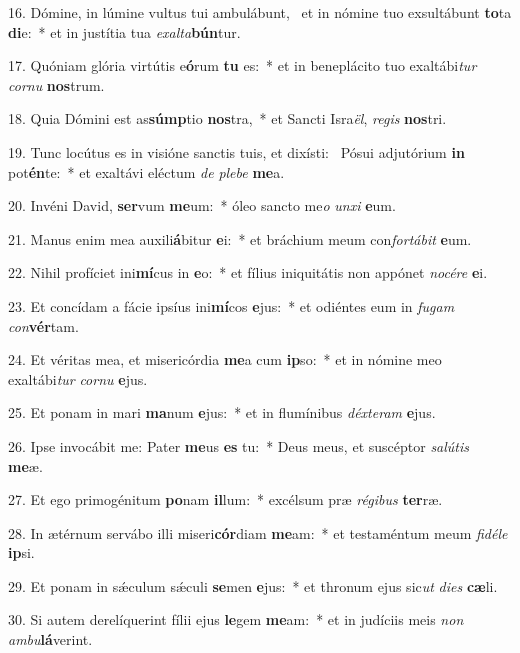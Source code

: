 16. Dómine, in lúmine vultus tui ambulábunt, \dag\  et in nómine tuo exsultábunt \textbf{to}ta \textbf{di}e:~*  et in justítia tua \textit{ex}\textit{al}\textit{ta}\textbf{bún}tur.\

17. Quóniam glória virtútis e\textbf{ó}rum \textbf{tu} es:~*  et in beneplácito tuo exaltábi\textit{tur} \textit{cor}\textit{nu} \textbf{nos}trum.\

18. Quia Dómini est as\textbf{súmp}tio \textbf{nos}tra,~*  et Sancti Isra\textit{ël}, \textit{re}\textit{gis} \textbf{nos}tri.\

19. Tunc locútus es in visióne sanctis tuis, et dixísti: \dag\  Pósui adjutórium \textbf{in} pot\textbf{én}te:~*  et exaltávi eléctum \textit{de} \textit{ple}\textit{be} \textbf{me}a.\

20. Invéni David, \textbf{ser}vum \textbf{me}um:~*  óleo sancto me\textit{o} \textit{un}\textit{xi} \textbf{e}um.\

21. Manus enim mea auxili\textbf{á}bitur \textbf{e}i:~*  et bráchium meum con\textit{for}\textit{tá}\textit{bit} \textbf{e}um.\

22. Nihil profíciet ini\textbf{mí}cus in \textbf{e}o:~*  et fílius iniquitátis non appónet \textit{no}\textit{cé}\textit{re} \textbf{e}i.\

23. Et concídam a fácie ipsíus ini\textbf{mí}cos \textbf{e}jus:~*  et odiéntes eum in \textit{fu}\textit{gam} \textit{con}\textbf{vér}tam.\

24. Et véritas mea, et misericórdia \textbf{me}a cum \textbf{ip}so:~*  et in nómine meo exaltábi\textit{tur} \textit{cor}\textit{nu} \textbf{e}jus.\

25. Et ponam in mari \textbf{ma}num \textbf{e}jus:~*  et in flumínibus \textit{déx}\textit{te}\textit{ram} \textbf{e}jus.\

26. Ipse invocábit me: Pater \textbf{me}us \textbf{es} tu:~*  Deus meus, et suscéptor \textit{sa}\textit{lú}\textit{tis} \textbf{me}æ.\

27. Et ego primogénitum \textbf{po}nam \textbf{il}lum:~*  excélsum præ \textit{ré}\textit{gi}\textit{bus} \textbf{ter}ræ.\

28. In ætérnum servábo illi miseri\textbf{cór}diam \textbf{me}am:~*  et testaméntum meum \textit{fi}\textit{dé}\textit{le} \textbf{ip}si.\

29. Et ponam in sǽculum sǽculi \textbf{se}men \textbf{e}jus:~*  et thronum ejus sic\textit{ut} \textit{di}\textit{es} \textbf{cæ}li.\

30. Si autem derelíquerint fílii ejus \textbf{le}gem \textbf{me}am:~*  et in judíciis meis \textit{non} \textit{am}\textit{bu}\textbf{lá}verint.\

